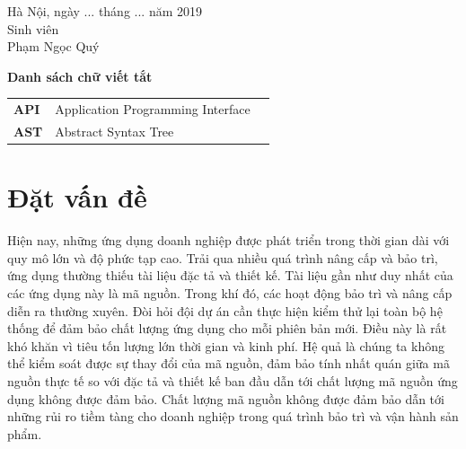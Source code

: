 \documentclass[12pt]{report}
\begin{document}
\begin{flushright}
	\begin{varwidth}{\linewidth}\centering
		Hà Nội, ngày ... tháng ... năm 2019\\
		Sinh viên\\[2cm]
		Phạm Ngọc Quý
	\end{varwidth}
\end{flushright}

\newpage
\tableofcontents

\newpage
{}
\listoftables

\newpage
{}
\begin{flushleft}
\bfseries{\Huge{Danh sách chữ viết tắt}}
\end{flushleft}
\begin{table}[h]
	\centering
	\begin{tabular}{lll}
	\textbf{API}  & Application Programming Interface\\[0.3cm]
	\textbf{AST}  & Abstract Syntax Tree\\[0.3cm]
	\end{tabular}
\end{table}

\newpage
{}
\listoffigures

\newpage
{}
\setcounter{page}{1}
\chapter{Đặt vấn đề}
\label{chap:intro}
Hiện nay, những ứng dụng doanh nghiệp được phát triển trong thời gian dài với quy mô lớn và độ phức tạp cao. Trải qua nhiều quá trình nâng cấp và bảo trì, ứng dụng thường thiếu tài liệu đặc tả và thiết kế. Tài liệu gần như duy nhất của các ứng dụng này là mã nguồn.
Trong khí đó, các hoạt động bảo trì và nâng cấp diễn ra thường xuyên. Đòi hỏi đội dự án cần thực hiện kiểm thử lại toàn bộ hệ thống để đảm bảo chất lượng ứng dụng cho mỗi phiên bản mới. Điều này là rất khó khăn vì tiêu tốn lượng lớn thời gian và kinh phí. Hệ quả là chúng ta không thể kiểm soát được sự thay đổi của mã nguồn, đảm bảo tính nhất quán giữa mã nguồn thực tế so với đặc tả và thiết kế ban đầu dẫn tới chất lượng mã nguồn ứng dụng không được đảm bảo. Chất lượng mã nguồn không được đảm bảo dẫn tới những rủi ro tiềm tàng cho doanh nghiệp trong quá trình bảo trì và vận hành sản phẩm.
\end{document}
